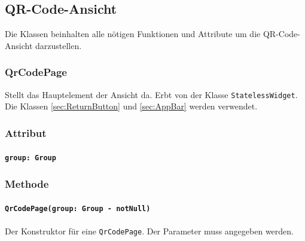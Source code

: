 \documentclass{entwurfsheft}
\begin{document}
        \newpage

\subsection{QR-Code-Ansicht}
    Die Klassen beinhalten alle nötigen Funktionen und Attribute um die QR-Code-Ansicht darzustellen.

    \subsubsection{QrCodePage}
    Stellt das Hauptelement der Ansicht da. Erbt von der Klasse \texttt{StatelessWidget}. Die Klassen \ref{sec:ReturnButton} und \ref{sec:AppBar} werden verwendet.
        \subsubsection*{Attribut}
            \paragraph*{\texttt{group: Group}}

        \subsubsection*{Methode}
            \paragraph*{\texttt{QrCodePage(group: Group - notNull)}} Der Konstruktor für eine \texttt{QrCodePage}. Der Parameter muss angegeben werden.
\end{document}
